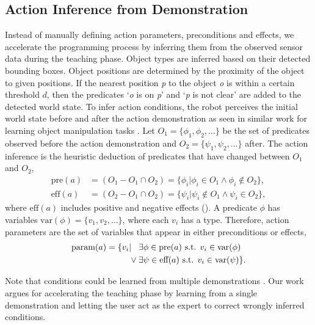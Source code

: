\subsection{Action Inference from Demonstration}
\label{sec:inference}
Instead of manually defining action parameters, preconditions and effects, we accelerate the programming process by inferring them from the observed sensor data during the teaching phase.
Object types are inferred based on their detected bounding boxes.
Object positions are determined by the proximity of the object to given positions.
If the nearest position \emph{p} to the object \emph{o} is within a certain threshold $d$, then the predicates `\emph{o} is on \emph{p}' and `\emph{p} is not clear' are added to the detected world state.
To infer action conditions, the robot perceives the initial world state   before and after the action demonstration as seen in similar work for learning object manipulation tasks \cite{ahmadzadeh2015learning}.
Let $O_1 = \{\phi_1, \phi_2, ... \}$ be the set of predicates observed before the action demonstration and $O_2 = \{\psi_1, \psi_2, ... \}$ after.
The action inference is the heuristic deduction of predicates that have changed between $O_1$ and $O_2$, \ie
\begin{align*} \text{pre}(a) &= (O_1 - O_1 \cap O_2) = \{\phi_i | \phi_i \in O_1 \wedge \phi_i \notin O_2 \}, \\
\text{eff}(a) &= (O_2 - O_1 \cap O_2) = \{\psi_i | \psi_i \notin O_1 \wedge \psi_i \in O_2 \}, 
\end{align*}
where $\text{eff}(a)$ includes positive and negative effects ().
A predicate $\phi$ has variables $\text{var}(\phi) = \{v_1, v_2, \dots\}$, where each $v_i$ has a type.
Therefore, action parameters are the set of variables that appear in either preconditions or effects, \ie
\begin{align*}
\text{param}(a) = \{v_i &| \hspace{0.3cm}\exists \phi \in \text{pre}(a) \text{ s.t. } v_i \in \text{var}(\phi)\\
&\lor \exists \psi \in \text{eff}(a) \text{ s.t. } v_i \in \text{var}(\psi) \}.
\end{align*}

Note that conditions could be learned from multiple demonstrations \cite{abdo2013learning,konidaris2018fromSkills}.
Our work argues for accelerating the teaching phase by learning from a single demonstration and letting the user act as the expert to correct wrongly inferred conditions.


